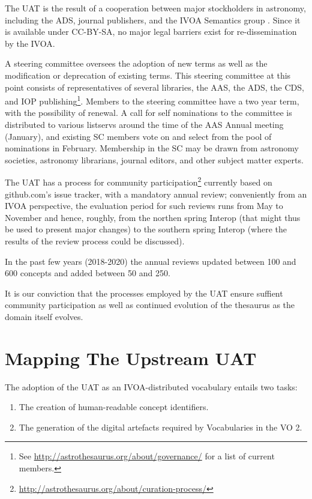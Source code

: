 \documentclass[11pt,a4paper]{ivoa}
\begin{document}
The UAT is the result of a cooperation between major stockholders in
astronomy, including the ADS, journal publishers, and the IVOA Semantics
group \citep{2014ASPC..485..461A}.  Since it is available under CC-BY-SA, 
no major legal barriers exist for re-dissemination by the IVOA.

A steering committee oversees the adoption of new terms as well as the
modification or deprecation of existing terms.  This steering committee
at this point consists of representatives of several libraries, the AAS,
the ADS, the CDS, and IOP publishing\footnote{See
\url{http://astrothesaurus.org/about/governance/} for a list of current
members.}.  Members to the steering committee have a two year term, with
the possibility of renewal.  A call for self nominations to the
committee is distributed to various listservs around the time of the AAS
Annual meeting (January), and existing SC members vote on and select
from the pool of nominations in February.  Membership in the SC may be
drawn from astronomy societies, astronomy librarians, journal editors,
and other subject matter experts.

The UAT has a process for community
participation\footnote{\url{http://astrothesaurus.org/about/curation-process/}}
currently based on github.com's issue tracker, with a mandatory annual
review; conveniently from an IVOA perspective, the evaluation period for
such reviews runs from May to November and hence, roughly, from the
northen spring Interop (that might thus be used to present major
changes) to the southern spring Interop (where the results of the review
process could be discussed).

In the past few years (2018-2020) the annual reviews updated between 100
and 600 concepts and added between 50 and 250.

It is our conviction that the processes employed by the UAT ensure
suffient community participation as well as continued evolution of the
thesaurus as the domain itself evolves.

\section{Mapping The Upstream UAT}

The adoption of the UAT as an IVOA-distributed vocabulary entails two
tasks:

\begin{enumerate}
\item The creation of human-readable concept identifiers.
\item The generation of the digital artefacts required by Vocabularies
in the VO 2.
\end{enumerate}
\end{document}
